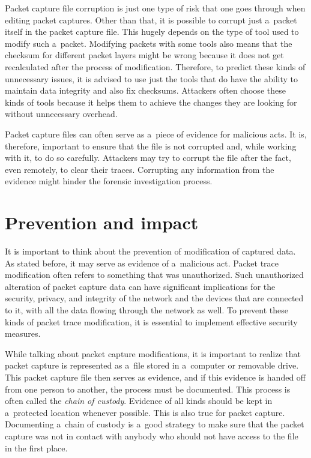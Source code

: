 \documentclass[
  printed,     %
  color,       %
  oneside,     %
  nosansbold,  %
  nocolorbold, %
  nolof,         %
  nolot,         %
]{fithesis4}
\begin{document}
Packet capture file corruption is just one type of risk that one goes through when editing packet captures. Other than that, it is possible to corrupt just a~packet itself in the packet capture file. This hugely depends on the type of tool used to modify such a~packet. Modifying packets with some tools also means that the checksum for different packet layers might be wrong because it does not get recalculated after the process of modification. Therefore, to predict these kinds of unnecessary issues, it is advised to use just the tools that do have the ability to maintain data integrity and also fix checksums. Attackers often choose these kinds of tools because it helps them to achieve the changes they are looking for without unnecessary overhead.

Packet capture files can often serve as a~piece of evidence for malicious acts. It is, therefore, important to ensure that the file is not corrupted and, while working with it, to do so carefully. Attackers may try to corrupt the file after the fact, even remotely, to clear their traces. Corrupting any information from the evidence might hinder the forensic investigation process.

\section{Prevention and impact}

It is important to think about the prevention of modification of captured data. As stated before, it may serve as evidence of a~malicious act. Packet trace modification often refers to something that was unauthorized. Such unauthorized alteration of packet capture data can have significant implications for the security, privacy, and integrity of the network and the devices that are connected to it, with all the data flowing through the network as well. To prevent these kinds of packet trace modification, it is essential to implement effective security measures.

While talking about packet capture modifications, it is important to realize that packet capture is represented as a~file stored in a~computer or removable drive. This packet capture file then serves as evidence, and if this evidence is handed off from one person to another, the process must be documented. This process is often called the \textit{chain of custody}. Evidence of all kinds should be kept in a~protected location whenever possible. This is also true for packet capture. Documenting a~chain of custody is a~good strategy to make sure that the packet capture was not in contact with anybody who should not have access to the file in the first place.
\end{document}
